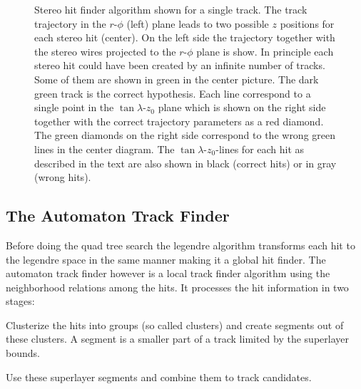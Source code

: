 \begin{figure}
 \caption[Stereo legendre algorithm.]{Stereo hit finder algorithm shown for a single track. The track trajectory in the $r$-$\phi$ (left) plane leads to two possible $z$ positions for each stereo hit (center). On the left side the trajectory together with the stereo wires projected to the $r$-$\phi$ plane is show. In principle each stereo hit could have been created by an infinite number of tracks. Some of them are shown in green in the center picture. The dark green track is the correct hypothesis. Each line correspond to a single point in the $\tan \lambda$-$z_0$ plane which is shown on the right side together with the correct trajectory parameters as a red diamond. The green diamonds on the right side correspond to the wrong green lines in the center diagram. The $\tan \lambda$-$z_0$-lines for each hit as described in the text are also shown in black (correct hits) or in gray (wrong hits).}
 \label{fig-stereo-explained}
\end{figure}


\subsection{The Automaton Track Finder}
Before doing the quad tree search the legendre algorithm transforms each hit to the legendre space in the same manner making it a global hit finder. The automaton track finder however is a local track finder algorithm using the neighborhood relations among the hits. It processes the hit information in two stages:
\begin{zlist}
  \item Clusterize the hits into groups (so called clusters) and create segments out of these clusters. A segment is a smaller part of a track limited by the superlayer bounds. 
  \item Use these superlayer segments and combine them to track candidates.
\end{zlist}

